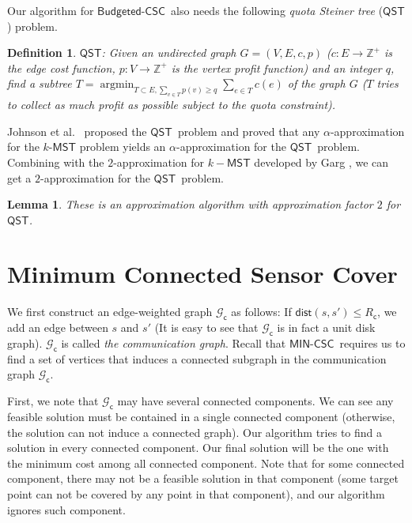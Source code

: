 \documentclass[11pt]{article}
\newcommand{\dist}{\mathsf{dist}}
\newcommand{\Z}{\mathbb{Z}}
\newcommand{\mincsc}{$\mathsf{MIN}$-$\mathsf{CSC}$}
\newcommand{\bcsc}{$\mathsf{Budgeted}$-$\mathsf{CSC}$}
\newcommand{\qst}{$\mathsf{QST}$}
\newcommand{\Rc}{R_\mathsf{c}}
\newcommand{\Gc}{\mathcal{G}_\mathsf{c}}
\newtheorem{lemma}{Lemma}
\newtheorem{definition}{Definition}
\begin{document}
Our algorithm for \bcsc\ also needs the following {\em quota Steiner tree} (\qst) problem.

\begin{definition}
	\qst: Given an undirected graph $G=(V,E,c,p)$
	($c: E\rightarrow \Z^+$ is the edge cost function,
	$p:V\rightarrow\Z^+$ is the vertex profit function) and an integer $q$,
find a subtree $T=\mathop{\arg\min}_{T \subset E,\sum_{v\in T } p(v) \geq q} \sum_{e \in T} c(e)$ of the graph $G$
	($T$ tries to collect as much profit as possible subject to the quota constraint).
\end{definition}


Johnson et al.~\cite{johnson2000prize} proposed the \qst\ problem and proved that any $\alpha$-approximation for the $k$-$\mathsf{MST}$ problem yields an $\alpha$-approximation for the \qst\ problem.
Combining with the $2$-approximation for $k-\mathsf{MST}$ developed by Garg \cite{garg2005saving},
we can get a $2$-approximation for the \qst\ problem.
\begin{lemma}
	\label{lm:qst}
	These is an  approximation algorithm with approximation factor $2$
	for \qst.
\end{lemma}



\section{Minimum Connected Sensor Cover}
\label{sec:mscs}

We first construct an edge-weighted graph $\Gc$ as follows:
If $\dist(s,s')\leq \Rc$, we add an edge between $s$ and $s'$
(It is easy to see that $\Gc$ is in fact a unit disk graph).
$\Gc$ is called {\em  the communication graph}.
Recall that \mincsc\ requires us to find a set of vertices
that induces a connected subgraph in the communication graph $\Gc$.

First, we note that $\Gc$ may have several connected components.
We can see any feasible solution must be contained in a single connected component
(otherwise, the solution can not induce a connected graph).
Our algorithm tries to find a solution in every connected component.
Our final solution will be the one with the minimum cost among all connected component.
Note that for some connected component, there may not be a feasible solution
in that component (some target point can not be covered by any point in that component),
and our algorithm ignores such component.
\end{document}
